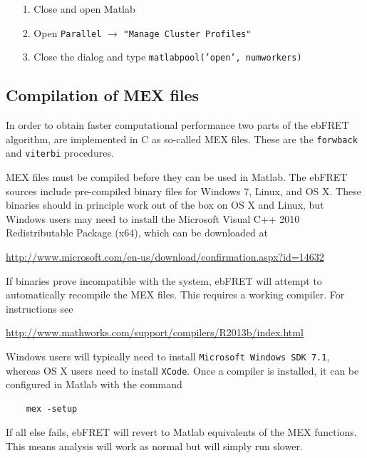 \documentclass[12pt,article,oldfontcommands]{memoir}
\newcommand{\indt}{\qquad}
\begin{document}
\begin{itemize}
\item[1.] Close and open Matlab
\item[2.] Open \texttt{Parallel} $\to$ \texttt{"Manage Cluster Profiles"}
\item[3.] Close the dialog and type \texttt{matlabpool('open', numworkers)}
\end{itemize}

\subsection{Compilation of MEX files}

In order to obtain faster computational performance two parts of the ebFRET algorithm, are implemented in C as so-called MEX files. These are the \texttt{forwback} and \texttt{viterbi} procedures. 

MEX files must be compiled before they can be used in Matlab. The ebFRET sources include pre-compiled binary files for Windows 7, Linux, and OS X. These binaries should in principle work out of the box on OS X and Linux, but Windows users may need to install the Microsoft Visual C++ 2010 Redistributable Package (x64), which can be downloaded at
    
\indt\url{http://www.microsoft.com/en-us/download/confirmation.aspx?id=14632}

If binaries prove incompatible with the system, ebFRET will attempt to automatically recompile the MEX files. This requires a working compiler. For instructions see

\indt\url{http://www.mathworks.com/support/compilers/R2013b/index.html}

Windows users will typically need to install \texttt{Microsoft Windows SDK 7.1}, whereas OS X users need to install \texttt{XCode}. Once a compiler is installed, it can be configured in Matlab with the command

\begin{verbatim}
    mex -setup
\end{verbatim}

If all else fails, ebFRET will revert to Matlab equivalents of the MEX functions. This means analysis will work as normal but will simply run slower.
\end{document}
